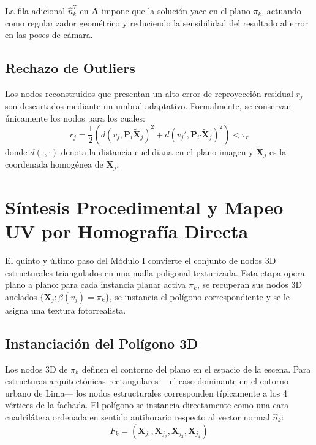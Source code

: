 La fila adicional $\hat{n}_k^T$ en $\mathbf{A}$ impone que la solución yace en el plano $\pi_k$, actuando como regularizador geométrico y reduciendo la sensibilidad del resultado al error en las poses de cámara.
 
\subsection{Rechazo de Outliers}
 
Los nodos reconstruidos que presentan un alto error de reproyección residual $r_j$ son descartados mediante un umbral adaptativo. Formalmente, se conservan únicamente los nodos para los cuales:
\begin{equation}
    r_j = \frac{1}{2}\left( d(v_j, \mathbf{P}_i \tilde{\mathbf{X}}_j)^2 + d(v_j', \mathbf{P}_{i'} \tilde{\mathbf{X}}_j)^2 \right) < \tau_r
\end{equation}
donde $d(\cdot, \cdot)$ denota la distancia euclidiana en el plano imagen y $\tilde{\mathbf{X}}_j$ es la coordenada homogénea de $\mathbf{X}_j$.

\section{Síntesis Procedimental y Mapeo UV por Homografía Directa}

El quinto y último paso del Módulo I convierte el conjunto de nodos 3D estructurales triangulados en una malla poligonal texturizada. Esta etapa opera plano a plano: para cada instancia planar activa $\pi_k$, se recuperan sus nodos 3D anclados $\{\mathbf{X}_j : \beta(v_j) = \pi_k\}$, se instancia el polígono correspondiente y se le asigna una textura fotorrealista.
 
\subsection{Instanciación del Polígono 3D}
 
Los nodos 3D de $\pi_k$ definen el contorno del plano en el espacio de la escena. Para estructuras arquitectónicas rectangulares —el caso dominante en el entorno urbano de Lima— los nodos estructurales corresponden típicamente a los 4 vértices de la fachada. El polígono se instancia directamente como una cara cuadrilátera ordenada en sentido antihorario respecto al vector normal $\hat{n}_k$:
\begin{equation}
    F_k = (\mathbf{X}_{j_1}, \mathbf{X}_{j_2}, \mathbf{X}_{j_3}, \mathbf{X}_{j_4})
\end{equation}
 
